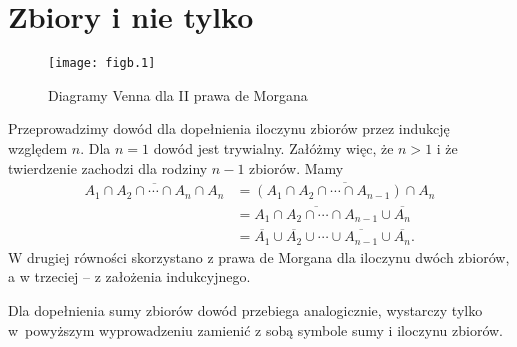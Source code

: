 \chapter{Zbiory i nie tylko}


\exercise %
\begin{figure}[ht]
	\begin{center}
		\texttt{[image: figb.1]}
	\end{center}
	\caption{Diagramy Venna dla II prawa de Morgana}
\end{figure}

\exercise %
Przeprowadzimy dowód dla dopełnienia iloczynu zbiorów przez indukcję względem $n$. Dla $n=1$ dowód jest trywialny. Załóżmy więc, że $n>1$ i że twierdzenie zachodzi dla rodziny $n-1$ zbiorów. Mamy
\begin{align*}
	\overline{A_1\cap A_2\cap\cdots\cap A_n\cap A_n} &= \overline{(A_1\cap A_2\cap\cdots\cap A_{n-1})\cap A_n} \\
	&= \overline{A_1\cap A_2\cap\cdots\cap A_{n-1}}\cup\overline{A_n} \\
	&= \overline{A_1}\cup\overline{A_2}\cup\cdots\cup\overline{A_{n-1}}\cup\overline{A_n}.
\end{align*}
W drugiej równości skorzystano z prawa de Morgana dla iloczynu dwóch zbiorów, a w trzeciej -- z założenia indukcyjnego.

Dla dopełnienia sumy zbiorów dowód przebiega analogicznie, wystarczy tylko w~powyższym wyprowadzeniu zamienić z sobą symbole sumy i iloczynu zbiorów.

